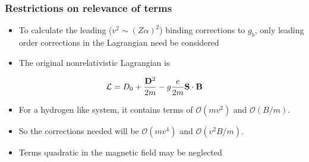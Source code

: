 \documentclass[11ppt]{beamer}
\newcommand{\beq}{\begin{equation*} }
\newcommand{\eeq}{\end{equation*} }
\begin{document}
\begin{frame}
\frametitle{Restrictions on relevance of terms}
\begin{itemize}
\item To calculate the leading ($v^2 \sim (Z\alpha)^2$) binding corrections to $g_b$, only leading order corrections in the Lagrangian need be considered
\item The original nonrelativistic Lagrangian is
\end{itemize}
 
\begin{equation}
	\mathcal{L} = D_0 + \frac{ \mathbf{D}^2}{2m}  - g \frac{e}{2m} \mathbf{S} \cdot \mathbf{B}
\end{equation}
\begin{itemize}
\item For a hydrogen like system, it contains terms of $\mathcal{O}(mv^2)$ and $\mathcal{O}(B/m)$.  
\item So the corrections needed will be $\mathcal{O}(mv^4)$ and $\mathcal{O}(v^2 B/m)$. 
\item Terms quadratic in the magnetic field may be neglected
\end{itemize}
\end{frame}







% 
% 
% 
% 
\end{document}

